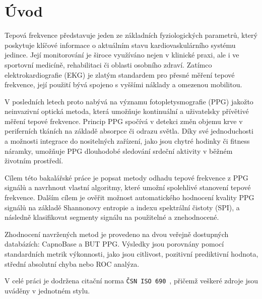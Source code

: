 \chapter*{Úvod}
{}
\label{ch:uvod}

Tepová frekvence představuje jeden ze základních fyziologických parametrů, který poskytuje klíčové informace o aktuálním stavu kardiovaskulárního systému jedince.
Její monitorování je široce využíváno nejen v klinické praxi, ale i ve sportovní medicíně, rehabilitaci či oblasti osobního zdraví.
Zatímco elektrokardiografie (\acs{EKG}) je zlatým standardem pro přesné měření tepové frekvence, její použití bývá spojeno s vyššími náklady a omezenou mobilitou.

V posledních letech proto nabývá na významu fotopletysmografie (\acs{PPG}) jakožto neinvazivní optická metoda, která umožňuje kontinuální a uživatelsky přívětivé měření tepové frekvence.
Princip \acs{PPG} spočívá v detekci změn objemu krve v periferních tkáních na základě absorpce či odrazu světla.
Díky své jednoduchosti a možnosti integrace do nositelných zařízení, jako jsou chytré hodinky či fitness náramky, umožňuje \acs{PPG} dlouhodobé sledování srdeční aktivity v běžném životním prostředí.

Cílem této bakalářské práce je popsat metody odhadu tepové frekvence z \acs{PPG} signálů a navrhnout vlastní algoritmy, které umožní spolehlivé stanovení tepové frekvence.
Dalším cílem je ověřit možnost automatického hodnocení kvality \acs{PPG} signálů na základě Shannonovy entropie a indexu spektrální čistoty (\acs{SPI}), a následně klasifikovat segmenty signálu na použitelné a znehodnocené.

Zhodnocení navržených metod je provedeno na dvou veřejně dostupných databázích: CapnoBase a \acs{BUT PPG}.
Výsledky jsou porovnány pomocí standardních metrik výkonnosti, jako jsou citlivost, pozitivní prediktivní hodnota, střední absolutní chyba nebo ROC analýza.

V celé práci je dodržena citační norma \texttt{ČSN ISO 690}~\cite{Vyklad_normy_CSN_ISO_690-2022,CSN_ISO_690-2022}, přičemž veškeré zdroje jsou uváděny v jednotném stylu.

% 
% 
% 
